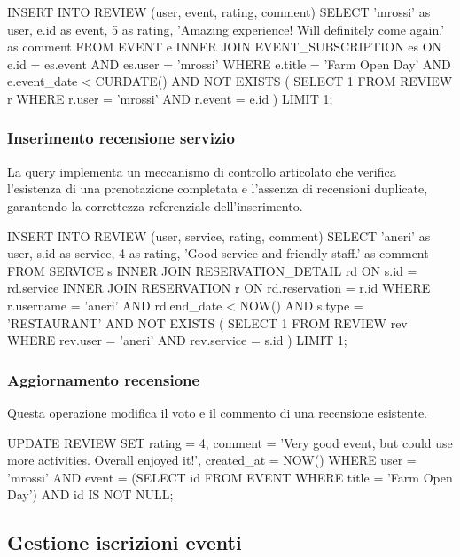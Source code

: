 \documentclass[a4paper,12pt]{report}
\begin{document}
\begin{sqlcode}[caption={Query per inserimento recensione evento}]
INSERT INTO REVIEW (user, event, rating, comment) 
SELECT 'mrossi' as user, e.id as event, 5 as rating, 
       'Amazing experience! Will definitely come again.' as comment 
FROM EVENT e 
INNER JOIN EVENT_SUBSCRIPTION es ON e.id = es.event AND es.user = 'mrossi' 
WHERE e.title = 'Farm Open Day' 
  AND e.event_date < CURDATE() 
  AND NOT EXISTS (
    SELECT 1 
    FROM REVIEW r 
    WHERE r.user = 'mrossi' AND r.event = e.id
  ) 
LIMIT 1;
\end{sqlcode}

\subsubsection{Inserimento recensione servizio} 
La query implementa un meccanismo di controllo articolato che verifica l'esistenza di una prenotazione completata e l'assenza di recensioni duplicate, garantendo la correttezza referenziale dell'inserimento.

\begin{sqlcode}[caption={Query per inserimento recensione servizio}]
INSERT INTO REVIEW (user, service, rating, comment) 
SELECT 'aneri' as user, s.id as service, 4 as rating, 
       'Good service and friendly staff.' as comment 
FROM SERVICE s 
INNER JOIN RESERVATION_DETAIL rd ON s.id = rd.service 
INNER JOIN RESERVATION r ON rd.reservation = r.id 
WHERE r.username = 'aneri' 
  AND rd.end_date < NOW() 
  AND s.type = 'RESTAURANT' 
  AND NOT EXISTS (
    SELECT 1 
    FROM REVIEW rev 
    WHERE rev.user = 'aneri' AND rev.service = s.id
  ) 
LIMIT 1;
\end{sqlcode}

\subsubsection{Aggiornamento recensione} 
Questa operazione modifica il voto e il commento di una recensione esistente.

\begin{sqlcode}[caption={Query per aggiornamento recensione}]
UPDATE REVIEW 
SET rating = 4, 
    comment = 'Very good event, but could use more activities. Overall enjoyed it!',
    created_at = NOW() 
WHERE user = 'mrossi' 
  AND event = (SELECT id FROM EVENT WHERE title = 'Farm Open Day') 
  AND id IS NOT NULL;
\end{sqlcode}

\subsection{Gestione iscrizioni eventi} 
\end{document}
